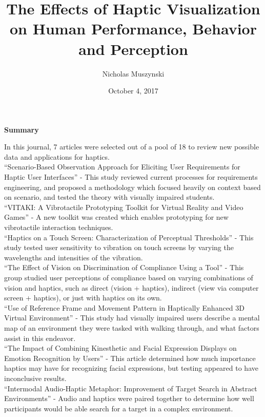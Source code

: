 \documentclass{article}
\begin{document}
\title{The Effects of Haptic Visualization on Human Performance, Behavior and Perception}
\author{Nicholas Muszynski}
\date{October 4, 2017}

\maketitle

\textbf{Summary}
\newline

In this journal, 7 articles were selected out of a pool of 18 to review new possible data and applications for haptics.\\
"`Scenario-Based Observation Approach for Eliciting User Requirements for Haptic User Interfaces"' - This study reviewed current processes for requirements engineering, and proposed a methodology which focused heavily on context based on scenario, and tested the theory with visually impaired students.\\
"`VITAKI: A Vibrotactile Prototyping Toolkit for Virtual Reality and Video Games"' - A new toolkit was created which enables prototyping for new vibrotactile interaction techniques.\\
"`Haptics on a Touch Screen: Characterization of Perceptual Thresholds"' - This study tested user sensitivity to vibration on touch screens by varying the wavelengths and intensities of the vibration.\\
"`The Effect of Vision on Discrimination of Compliance Using a Tool"' - This group studied user perceptions of compliance based on varying combinations of vision and haptics, such as direct (vision + haptics), indirect (view via computer screen + haptics), or just with haptics on its own.\\
"`Use of Reference Frame and Movement Pattern in Haptically Enhanced 3D Virtual Environment"' - This study had visually impaired users describe a mental map of an environment they were tasked with walking through, and what factors assist in this endeavor.\\
"`The Impact of Combining Kinesthetic and Facial Expression Displays on Emotion Recognition by Users"' - This article determined how much importance haptics may have for recognizing facial expressions, but testing appeared to have inconclusive results.\\
"`Intermodal Audio-Haptic Metaphor: Improvement of Target Search in Abstract Environments"' - Audio and haptics were paired together to determine how well participants would be able search for a target in a complex environment.


\nocite{article2cite}



\end{document}
